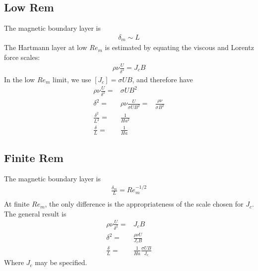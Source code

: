 \documentclass[11pt]{article}
\begin{document}
\subsection{Low Rem}
The magnetic boundary layer is
\begin{equation}\begin{aligned}
	\delta_m \sim L
\end{aligned}\end{equation}
The Hartmann layer at low $Re_m$ is estimated by equating the viscous and Lorentz force scales:
\begin{equation}\begin{aligned}
	\rho \nu \frac{U}{\delta^2} = J_c B
\end{aligned}\end{equation}
In the low $Re_m$ limit, we use $[J_c] = \sigma U B$, and therefore have
\begin{equation}\begin{aligned}
	\rho \nu \frac{U}{\delta^2} =& \sigma U B^2 \\
	\delta^2 =& \rho \nu \frac{U}{\sigma U B^2}
	         = & \frac{\rho \nu}{\sigma B^2} \\
	\frac{\delta^2}{L^2} =& \frac{1}{Ha^2} \\
	\frac{\delta}{L} =& \frac{1}{Ha}
\end{aligned}\end{equation}

\subsection{Finite Rem}
The magnetic boundary layer is
\begin{equation}\begin{aligned}
	\frac{\delta_m}{L} = Re_m^{-1/2} \\
\end{aligned}\end{equation}
At finite $Re_m$, the only difference is the appropriateness of the scale chosen for $J_c$. The general result is
\begin{equation}\begin{aligned}
	\rho \nu \frac{U}{\delta^2} =& J_c B \\
	\delta^2 =& \frac{\rho \nu U}{J_c B} \\
	\frac{\delta}{L} =& \frac{1}{Ha} \frac{\sigma U B}{J_c}
\end{aligned}\end{equation}
Where $J_c$ may be specified.
\end{document}
